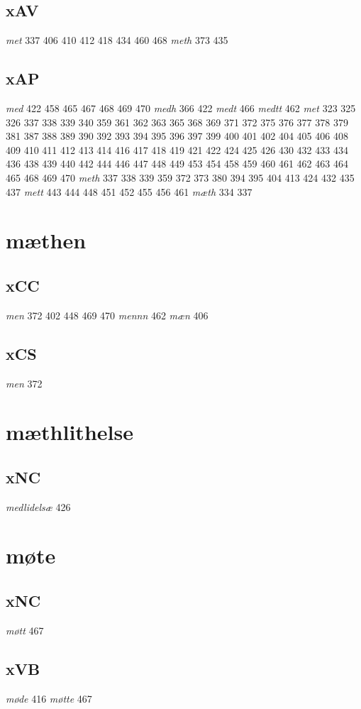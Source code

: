 \documentclass[a4paper,twocolumn]{article}
\begin{document}
\subsection{xAV}
\label{sec:orgcb98158}
\emph{met} 337 406 410 412 418 434 460 468 \emph{meth} 373 435 
\subsection{xAP}
\label{sec:org7caf132}
\emph{med} 422 458 465 467 468 469 470 \emph{medh} 366 422 \emph{medt} 466 \emph{medtt} 462 \emph{met} 323 325 326 337 338 339 340 359 361 362 363 365 368 369 371 372 375 376 377 378 379 381 387 388 389 390 392 393 394 395 396 397 399 400 401 402 404 405 406 408 409 410 411 412 413 414 416 417 418 419 421 422 424 425 426 430 432 433 434 436 438 439 440 442 444 446 447 448 449 453 454 458 459 460 461 462 463 464 465 468 469 470 \emph{meth} 337 338 339 359 372 373 380 394 395 404 413 424 432 435 437 \emph{mett} 443 444 448 451 452 455 456 461 \emph{mæth} 334 337 
\section{mæthen}
\label{sec:org57a3af8}
\subsection{xCC}
\label{sec:orge2ee19f}
\emph{men} 372 402 448 469 470 \emph{mennn} 462 \emph{mæn} 406 
\subsection{xCS}
\label{sec:orga89fa62}
\emph{men} 372 
\section{mæthlithelse}
\label{sec:orgfc907b3}
\subsection{xNC}
\label{sec:org03fba6c}
\emph{medlidelsæ} 426 
\section{møte}
\label{sec:orgbdcc8c2}
\subsection{xNC}
\label{sec:orgb8cec62}
\emph{møtt} 467 
\subsection{xVB}
\label{sec:org6211a51}
\emph{møde} 416 \emph{møtte} 467 
\end{document}

